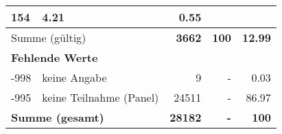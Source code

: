 \begin{longtable}{lXrrr}
       \num{154} &
       \num[round-mode=places,round-precision=2]{4.21} &
         \num[round-mode=places,round-precision=2]{0.55} \\
     \midrule
     \multicolumn{2}{l}{Summe (gültig)} &
       \textbf{\num{3662}} &
     \textbf{\num{100}} &
       \textbf{\num[round-mode=places,round-precision=2]{12.99}} \\
     \multicolumn{5}{l}{\textbf{Fehlende Werte}}\\
       -998 &
       keine Angabe &
         \num{9} &
        - &
         \num[round-mode=places,round-precision=2]{0.03} \\
       -995 &
       keine Teilnahme (Panel) &
         \num{24511} &
        - &
         \num[round-mode=places,round-precision=2]{86.97} \\
     \midrule
     \multicolumn{2}{l}{\textbf{Summe (gesamt)}} &
          \textbf{\num{28182}} &
        \textbf{-} &
        \textbf{\num{100}} \\
     \bottomrule
     \end{longtable}
     
